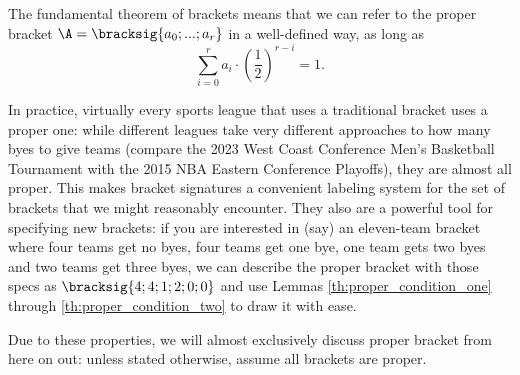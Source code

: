 {

The fundamental theorem of brackets means that we can refer to the proper bracket $\A = \bracksig{a_0; ...; a_r}$ in a well-defined way, as long as $$\sum_{i=0}^r a_i \cdot \left(\frac{1}{2}\right)^{r - i} = 1.$$

In practice, virtually every sports league that uses a traditional bracket uses a proper one: while different leagues take very different approaches to how many byes to give teams (compare the 2023 West Coast Conference Men's Basketball Tournament with the 2015 NBA Eastern Conference Playoffs), they are almost all proper. This makes bracket signatures a convenient labeling system for the set of brackets that we might reasonably encounter. They also are a powerful tool for specifying new brackets: if you are interested in (say) an eleven-team bracket where four teams get no byes, four teams get one bye, one team gets two byes and two teams get three byes, we can describe the proper bracket with those specs as $\bracksig{4; 4; 1; 2; 0; 0}$ and use Lemmas \ref{th:proper_condition_one} through \ref{th:proper_condition_two} to draw it with ease.


Due to these properties, we will almost exclusively discuss proper bracket from here on out: unless stated otherwise, assume all brackets are proper.
}